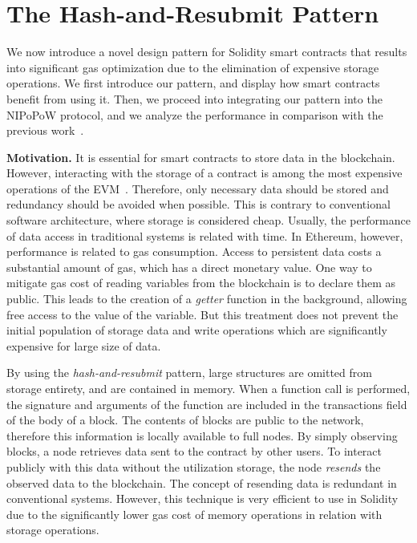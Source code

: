 \section{The Hash-and-Resubmit Pattern}

We now introduce a novel design pattern for Solidity smart contracts that
results into significant gas optimization due to the elimination of expensive
storage operations. We first introduce our pattern, and display how smart
contracts benefit from using it. Then, we proceed into integrating our pattern
into the NIPoPoW protocol, and we analyze the performance in comparison with the
previous work~\cite{gglou}.

\textbf{Motivation.}
It is essential for smart contracts to store data in the blockchain. However,
interacting with the storage of a contract is among the most expensive
operations of the EVM~\cite{wood, buterin}. Therefore, only necessary data
should be stored and redundancy should be avoided when possible. This is
contrary to conventional software architecture, where storage is considered
cheap. Usually, the performance of data access in traditional systems is
related with time. In Ethereum, however, performance is related to gas
consumption. Access to persistent data costs a substantial amount of gas, which
has a direct monetary value. One way to mitigate gas cost of reading variables
from the blockchain is to declare them as public. This leads to the creation of a
\emph{getter} function in the background, allowing free access to the value of
the variable. But this treatment does not prevent the initial population of
storage data and write operations which are significantly expensive for large size of data.

By using the \emph{hash-and-resubmit} pattern, large structures are omitted
from storage entirety, and are contained in memory. When a function call is
performed, the signature and arguments of the function are included in the
transactions field of the body of a block. The contents of blocks are public to
the network, therefore this information is locally available to full nodes. By
simply observing blocks, a node retrieves data sent to the contract by other
users. To interact publicly with this data without the utilization storage, the
node \emph{resends} the observed data to the blockchain. The concept of
resending data is redundant in conventional systems. However, this technique
is very efficient to use in Solidity due to the significantly lower gas cost
of memory operations in relation with storage operations.

